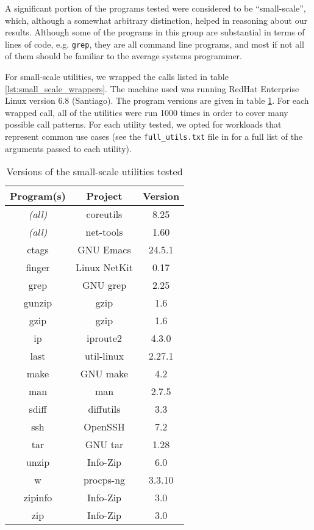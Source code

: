A significant portion of the programs tested were considered to be ``small-scale'', which, although a somewhat arbitrary distinction, helped in reasoning about our results. Although some of the programs in this group are substantial in terms of lines of code, e.g. \texttt{grep}, they are all command line programs, and most if not all of them should be familiar to the average systems programmer.

For small-scale utilities, we wrapped the calls listed in table \ref{lst:small_scale_wrappers}. The machine used was running RedHat Enterprise Linux version 6.8 (Santiago). The program versions are given in table \ref{tab:small_scale_versions}. For each wrapped call, all of the utilities were run 1000 times in order to cover many possible call patterns. For each utility tested, we opted for workloads that represent common use cases (see the \texttt{full\_utils.txt} file in \cite{github} for a full list of the arguments passed to each utility).

\begin{table}[h!]
\begin{center}
\begin{tabular}{ |c|c|c| }
\hline
\multicolumn{1}{|c|}{\textbf{Program(s)}} & \multicolumn{1}{c|}{\textbf{Project}} & \multicolumn{1}{c|}{\textbf{Version}} \\
\hline
\em{(all)} & coreutils  & 8.25 \\ 
\hline
\em{(all)} & net-tools & 1.60 \\
\hline
ctags&GNU Emacs & 24.5.1 \\
finger&Linux NetKit  & 0.17 \\
grep & GNU grep & 2.25 \\
gunzip & gzip & 1.6 \\
gzip & gzip & 1.6 \\
ip&iproute2 & 4.3.0 \\
last & util-linux & 2.27.1 \\
make & GNU make & 4.2 \\
man & man & 2.7.5 \\
sdiff&diffutils & 3.3 \\
ssh&OpenSSH & 7.2 \\
tar&GNU tar & 1.28 \\
unzip&Info-Zip  & 6.0 \\
w&procps-ng & 3.3.10 \\
zipinfo&Info-Zip & 3.0 \\
zip&Info-Zip & 3.0 \\
\hline
\end{tabular}
\caption{Versions of the small-scale utilities tested}
\label{tab:small_scale_versions}
\end{center}
\end{table}


